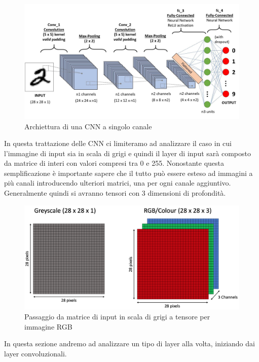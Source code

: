\documentclass[12pt,a4paper,openright,twoside]{report}
\begin{document}
\begin{figure}[h]
\centering
\includegraphics[width=\linewidth]{CNN_main.jpeg}
\caption{Archiettura di una CNN a singolo canale}
\end{figure}
In questa trattazione delle CNN ci limiteramo ad analizzare il caso in cui l'immagine di input sia in scala di grigi e quindi il layer di input sarà composto da matrice di interi con valori compresi tra 0 e 255.
Nonostante questa semplificazione è importante sapere che il tutto può essere esteso ad immagini a più canali introducendo ulteriori matrici, una per ogni canale aggiuntivo. Generalmente quindi si avranno tensori con 3 dimensioni di profondità. 
\newpage
\begin{figure}[h]
\centering
\includegraphics[width=\linewidth]{greyscaletorgb.png}
\caption{Passaggio da matrice di input in scala di grigi a tensore per immagine RGB}
\end{figure}

In questa sezione andremo ad analizzare un tipo di layer alla volta, iniziando dai layer convoluzionali.
\end{document}
